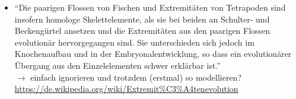 \begin{itemize}
 \item "`Die paarigen Flossen von Fischen und Extremitäten von Tetrapoden sind insofern homologe Skelettelemente, als sie bei beiden an Schulter- und Beckengürtel ansetzen und die Extremitäten aus den paarigen Flossen evolutionär hervorgegangen sind.\cite{homology} Sie unterschieden sich jedoch im Knochenaufbau und in der Embryonalentwicklung, so dass ein evolutionärer Übergang aus den Einzelelementen schwer erklärbar ist."'\\
 $\rightarrow$ einfach ignorieren und trotzdem (erstmal) so modellieren?\\
 \url{https://de.wikipedia.org/wiki/Extremit\%C3\%A4tenevolution}
\end{itemize}

